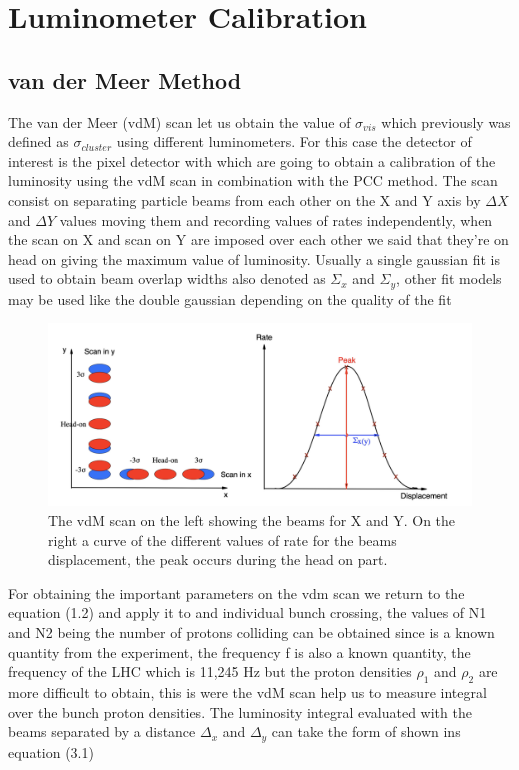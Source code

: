 \chapter{Luminometer Calibration}
\label{ch3}

\section{van der Meer Method}

The van der Meer (vdM) scan let us obtain the value of $\sigma_{vis}$ which previously was defined as $\sigma_{cluster}$ using different luminometers. For this case the detector of interest is the pixel detector with which are going to obtain a calibration of the luminosity using the vdM scan in combination with the PCC method. The scan consist on separating particle beams from each other on the X and Y axis by $\Delta X$ and $\Delta Y$ values moving them and recording values of rates independently, when the scan on X and scan on Y are imposed over each other we said that they're on head on giving the maximum value of luminosity. Usually a single gaussian fit is used to obtain beam overlap widths also denoted as $\Sigma_{x}$ and $\Sigma_{y}$, other fit models may be used like the double gaussian depending on the quality of the fit \cite{Vdm}

\begin{figure}[h]
    \centering
    \includegraphics[width=1\textwidth]{vdm1.png}
    \caption[vdM scan beams and curve.]{The vdM scan on the left showing the beams for X and Y. On the right a curve of the different values of rate for the beams displacement, the peak occurs during the head on part.}
    \label{fig:vdm1}
\end{figure}


For obtaining the important parameters on the vdm scan we return to the equation (1.2) and apply it to and individual bunch crossing, the values of N1 and N2 being the number of protons colliding can be obtained since is a known quantity from the experiment, the frequency f is also a known quantity, the frequency of the LHC which is 11,245 Hz but the proton densities $\rho_{1}$ and $\rho_{2}$ are more difficult to obtain, this is were the vdM scan help us to measure integral over the bunch proton densities. The luminosity integral evaluated with the beams separated by a distance $\Delta_{x}$ and $\Delta_{y}$ can take the form of shown ins equation (3.1)

